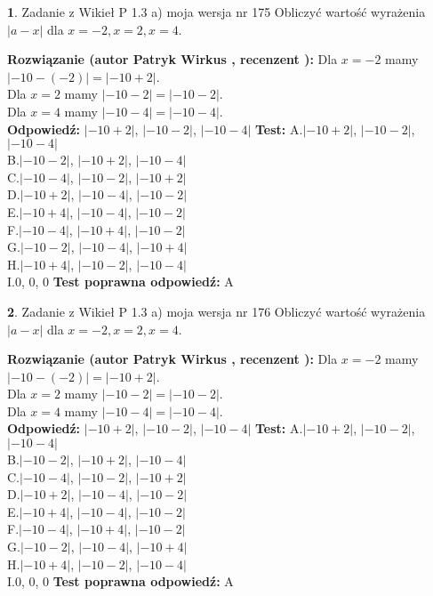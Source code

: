 \documentclass[12pt, a4paper]{article}
\theoremstyle{definition} %
\newtheorem{zad}{}
\newcommand{\zadStart}[1]{\begin{zad}#1\newline}
\newcommand{\zadStop}{\end{zad}}
\newcommand{\rozwStart}[2]{\noindent \textbf{Rozwiązanie (autor #1 , recenzent #2): }\newline}
\newcommand{\rozwStop}{\newline}
\newcommand{\odpStart}{\noindent \textbf{Odpowiedź:}\newline}
\newcommand{\odpStop}{\newline}
\newcommand{\testStart}{\noindent \textbf{Test:}\newline}
\newcommand{\testStop}{\newline}
\newcommand{\kluczStart}{\noindent \textbf{Test poprawna odpowiedź:}\newline}
\newcommand{\kluczStop}{\newline}
\begin{document}
\zadStart{Zadanie z Wikieł P 1.3 a) moja wersja nr 175}
Obliczyć wartość wyrażenia $|a - x|$ dla $x=-2,x=2,x=4$.
\zadStop
\rozwStart{Patryk Wirkus}{}
Dla $x = -2$ mamy $|-10 - (-2)| = |-10 + 2|$.\\
Dla $x = 2$ mamy $|-10 - 2| = |-10 - 2|$.\\
Dla $x = 4$ mamy $|-10 - 4| = |-10 - 4|$.\\
\rozwStop
\odpStart
$|-10 + 2|$, $|-10 - 2|$, $|-10 - 4|$
\odpStop
\testStart
A.$|-10 + 2|$, $|-10 - 2|$, $|-10 - 4|$\\
B.$|-10 - 2|$, $|-10 + 2|$, $|-10 - 4|$\\
C.$|-10 - 4|$, $|-10 - 2|$, $|-10 + 2|$\\
D.$|-10 + 2|$, $|-10 - 4|$, $|-10 - 2|$\\
E.$|-10 + 4|$, $|-10 - 4|$, $|-10 - 2|$\\
F.$|-10 - 4|$, $|-10 + 4|$, $|-10 - 2|$\\
G.$|-10 - 2|$, $|-10 - 4|$, $|-10 + 4|$\\
H.$|-10 + 4|$, $|-10 - 2|$, $|-10 - 4|$\\
I.$0$, $0$, $0$
\testStop
\kluczStart
A
\kluczStop



\zadStart{Zadanie z Wikieł P 1.3 a) moja wersja nr 176}
Obliczyć wartość wyrażenia $|a - x|$ dla $x=-2,x=2,x=4$.
\zadStop
\rozwStart{Patryk Wirkus}{}
Dla $x = -2$ mamy $|-10 - (-2)| = |-10 + 2|$.\\
Dla $x = 2$ mamy $|-10 - 2| = |-10 - 2|$.\\
Dla $x = 4$ mamy $|-10 - 4| = |-10 - 4|$.\\
\rozwStop
\odpStart
$|-10 + 2|$, $|-10 - 2|$, $|-10 - 4|$
\odpStop
\testStart
A.$|-10 + 2|$, $|-10 - 2|$, $|-10 - 4|$\\
B.$|-10 - 2|$, $|-10 + 2|$, $|-10 - 4|$\\
C.$|-10 - 4|$, $|-10 - 2|$, $|-10 + 2|$\\
D.$|-10 + 2|$, $|-10 - 4|$, $|-10 - 2|$\\
E.$|-10 + 4|$, $|-10 - 4|$, $|-10 - 2|$\\
F.$|-10 - 4|$, $|-10 + 4|$, $|-10 - 2|$\\
G.$|-10 - 2|$, $|-10 - 4|$, $|-10 + 4|$\\
H.$|-10 + 4|$, $|-10 - 2|$, $|-10 - 4|$\\
I.$0$, $0$, $0$
\testStop
\kluczStart
A
\kluczStop
\end{document}
